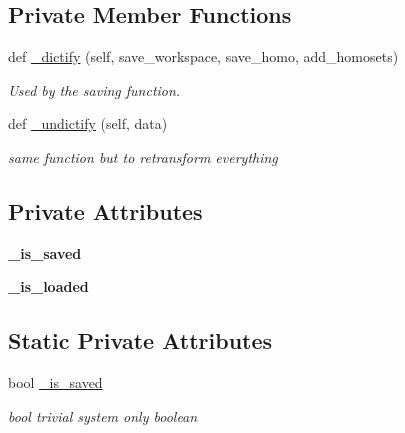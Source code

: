 \subsection*{Private Member Functions}
\begin{DoxyCompactItemize}
\item 
def \mbox{\hyperlink{class_py_c_u_b_1_1py_c_u_b_1_1_py_c_u_b_acf1d1899b90f65a22eef8bc93b1735ab}{\+\_\+dictify}} (self, save\+\_\+workspace, save\+\_\+homo, add\+\_\+homosets)
\begin{DoxyCompactList}\small\item\em Used by the saving function. \end{DoxyCompactList}\item 
def \mbox{\hyperlink{class_py_c_u_b_1_1py_c_u_b_1_1_py_c_u_b_a8f60d259562234b7872cdc9cef03ce75}{\+\_\+undictify}} (self, data)
\begin{DoxyCompactList}\small\item\em same function but to retransform everything \end{DoxyCompactList}\end{DoxyCompactItemize}
\subsection*{Private Attributes}
\begin{DoxyCompactItemize}
\item 
\mbox{\label{class_py_c_u_b_1_1py_c_u_b_1_1_py_c_u_b_aeb1012203f7072dafb43d297f76a438e}} 
{\bfseries \+\_\+is\+\_\+saved}
\item 
\mbox{\label{class_py_c_u_b_1_1py_c_u_b_1_1_py_c_u_b_a1cfa3e77ee07be4e8f1dd233fc97fea3}} 
{\bfseries \+\_\+is\+\_\+loaded}
\end{DoxyCompactItemize}
\subsection*{Static Private Attributes}
\begin{DoxyCompactItemize}
\item 
\mbox{\label{class_py_c_u_b_1_1py_c_u_b_1_1_py_c_u_b_aeb1012203f7072dafb43d297f76a438e}} 
bool \mbox{\hyperlink{class_py_c_u_b_1_1py_c_u_b_1_1_py_c_u_b_aeb1012203f7072dafb43d297f76a438e}{\+\_\+is\+\_\+saved}}
\begin{DoxyCompactList}\small\item\em bool trivial system only boolean \end{DoxyCompactList}\end{DoxyCompactItemize}


